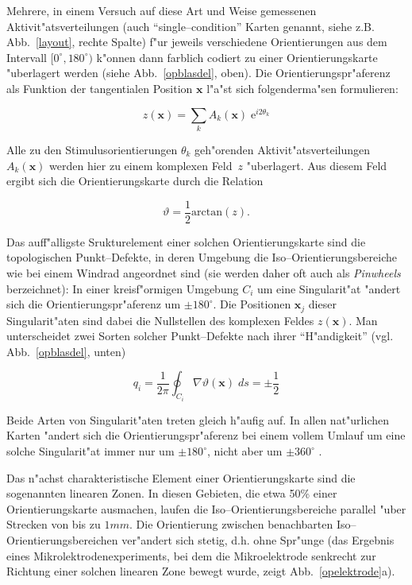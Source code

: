Mehrere, in einem Versuch auf diese Art und Weise gemessenen
Aktivit"atsverteilungen (auch ``single--condition'' Karten genannt, siehe
z.B. Abb.~\ref{layout}, rechte Spalte) f"ur jeweils verschiedene
Orientierungen aus dem Intervall $[0^\circ,180^\circ)$ k"onnen dann
farblich codiert zu einer Orientierungskarte "uberlagert werden (siehe
Abb.~\ref{opblasdel}, oben).  Die Orientierungspr"aferenz als Funktion der
tangentialen Position $\mathbf{x}$ l"a"st sich folgenderma"sen formulieren:

\begin{equation*}
z(\mathbf{x})=\sum\limits_k A_k(\mathbf{x})\; \text{e}^{i2\theta_k}
\label{zfeld}
\end{equation*}

Alle zu den Stimulusorientierungen $\theta_k$ geh"orenden
Aktivit"atsverteilungen $A_k(\mathbf{x})$ werden hier zu einem komplexen
Feld~$z$ "uberlagert.  Aus diesem Feld ergibt sich die Orientierungskarte
durch die Relation

\begin{equation*}
\vartheta=\frac{1}{2}\text{arctan}(z).
\end{equation*}

Das auff"alligste Srukturelement einer solchen Orientierungskarte sind die
topologischen Punkt--Defekte, in deren Umgebung die
Iso--Orientierungsbereiche wie bei einem Windrad angeordnet sind (sie
werden daher oft auch als \emph{Pinwheels} berzeichnet): In einer
kreisf"ormigen Umgebung $C_i$ um eine Singularit"at "andert sich die
Orientierungspr"aferenz um $\pm 180^\circ$.  Die Positionen $\mathbf{x}_j$
dieser Singularit"aten sind dabei die Nullstellen des komplexen Feldes
$z(\mathbf{x})$. Man unterscheidet zwei Sorten solcher Punkt--Defekte nach
ihrer ``H"andigkeit'' (vgl. Abb.~\ref{opblasdel}, unten)

\begin{equation}
q_i=\frac{1}{2\pi}\oint_{C_i}\!\!\nabla\vartheta(\mathbf{x})\;ds = \pm
\frac{1}{2}
\label{chi}
\end{equation}

Beide Arten von Singularit"aten treten gleich h"aufig auf.  In allen
nat"urlichen Karten "andert sich die Orientierungspr"aferenz bei einem
vollem Umlauf um eine solche Singularit"at immer nur um $\pm 180^\circ$,
nicht aber um $\pm 360^\circ$ .

Das n"achst charakteristische Element einer Orientierungskarte sind die
sogenannten linearen Zonen. In diesen Gebieten, die etwa 50\% einer
Orientierungskarte ausmachen, laufen die Iso--Orientierungsbereiche
parallel "uber Strecken von bis zu $1mm$. Die Orientierung zwischen
benachbarten Iso--Orientierungsbereichen ver"andert sich stetig, d.h. ohne
Spr"unge (das Ergebnis eines Mikrolektrodenexperiments, bei dem die
Mikroelektrode senkrecht zur Richtung einer solchen linearen Zone bewegt
wurde, zeigt Abb.~\ref{opelektrode}a).

